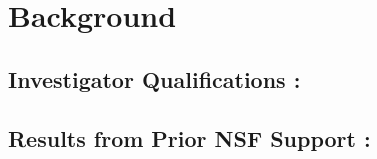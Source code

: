 
\section{Background}
\label{section-background}

\subsection{Investigator Qualifications :\space}
\label{subsection-qualifications}

\subsection{Results from Prior NSF Support :\space}
\label{subsection-priorresults}
